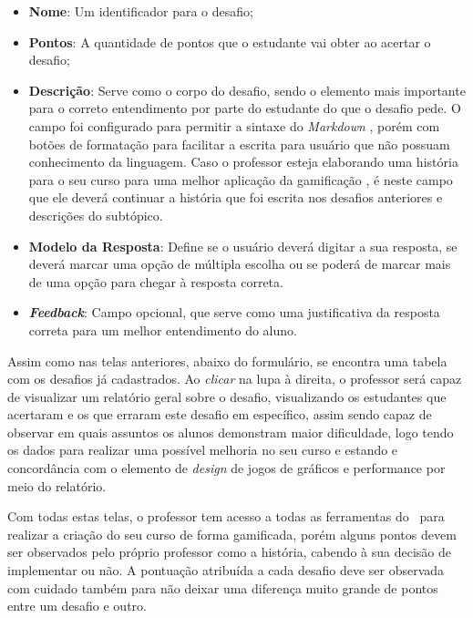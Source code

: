 \begin{itemize}
    \item \textbf{Nome}: Um identificador para o desafio;
    \item \textbf{Pontos}: A quantidade de pontos que o estudante vai obter ao acertar o desafio;
    \item \textbf{Descrição}: Serve como o corpo do desafio, sendo o elemento mais importante para o correto entendimento por parte do estudante do que o desafio pede. O campo foi configurado para permitir a sintaxe do \textit{Markdown} \cite{markdown}, porém com botões de formatação para facilitar a escrita para usuário que não possuam conhecimento da linguagem. Caso o professor esteja elaborando uma história para o seu curso para uma melhor aplicação da gamificação \cite{gamification_motivates}, é neste campo que ele deverá continuar a história que foi escrita nos desafios anteriores e descrições do subtópico.
    \item \textbf{Modelo da Resposta}: Define se o usuário deverá digitar a sua resposta, se deverá marcar uma opção de múltipla escolha ou se poderá de marcar mais de uma opção para chegar à resposta correta.
    \item \textbf{\textit{Feedback}}: Campo opcional, que serve como uma justificativa da resposta correta para um melhor entendimento do aluno.
\end{itemize}


Assim como nas telas anteriores, abaixo do formulário, se encontra uma tabela com os desafios já cadastrados. Ao \textit{clicar} na lupa à direita, o professor será capaz de visualizar um relatório geral sobre o desafio, visualizando os estudantes que acertaram e os que erraram este desafio em específico, assim sendo capaz de observar em quais assuntos os alunos demonstram maior dificuldade, logo tendo os dados para realizar uma possível melhoria no seu curso e estando e concordância com o elemento de \textit{design} de jogos de gráficos e performance por meio do relatório.


Com todas estas telas, o professor tem acesso a todas as ferramentas do \appName\ para realizar a criação do seu curso de forma gamificada, porém alguns pontos devem ser observados pelo próprio professor como a história, cabendo à sua decisão de implementar ou não. A pontuação atribuída a cada desafio deve ser observada com cuidado também para não deixar uma diferença muito grande de pontos entre um desafio e outro. 

